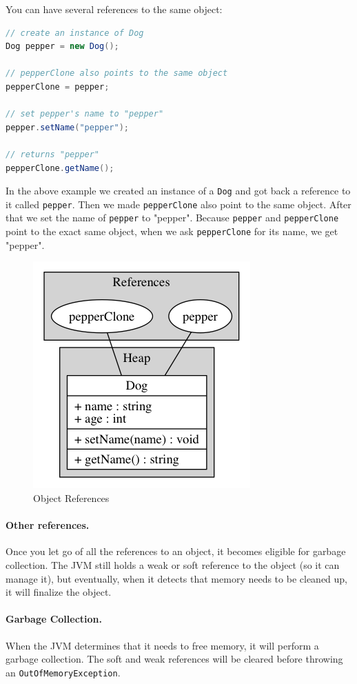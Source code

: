 You can have several references to the same object:
\begin{lstlisting}[language=Java]
// create an instance of Dog
Dog pepper = new Dog();

// pepperClone also points to the same object
pepperClone = pepper;

// set pepper's name to "pepper"
pepper.setName("pepper");

// returns "pepper"
pepperClone.getName();

\end{lstlisting}
In the above example we created an instance of a \texttt{Dog} and got back a reference to it called \texttt{pepper}. Then we made \texttt{pepperClone} also point to the same object. After that we set the name of \texttt{pepper} to "pepper". Because \texttt{pepper} and \texttt{pepperClone} point to the exact same object, when we ask \texttt{pepperClone} for its name, we get "pepper".

\begin{figure}[H]\centering %
\includegraphics[width=0.5\linewidth]{object-reference}
\caption{Object References}
\label{fig:object-references}
\end{figure}
\paragraph{Other references.} Once you let go of all the references to an object, it becomes eligible for garbage collection. The JVM still holds a weak or soft reference to the object (so it can manage it), but eventually, when it detects that memory needs to be cleaned up, it will finalize the object.\cite{reference}

\paragraph{Garbage Collection.} When the JVM determines that it needs to free memory, it will perform a garbage collection. The soft and weak references will be cleared before throwing an \texttt{OutOfMemoryException}. 

